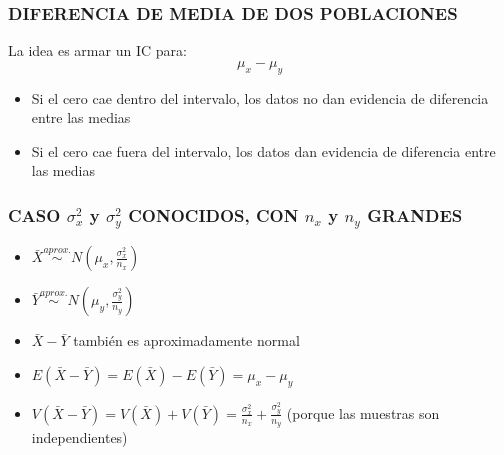 \documentclass{beamer}
\begin{document}
\begin{frame}
\frametitle{DIFERENCIA DE MEDIA DE DOS POBLACIONES}
La idea es armar un IC para: $$\mu_x-\mu_y$$
\begin{itemize}
\item Si el cero cae dentro del intervalo, los datos no dan evidencia
de diferencia entre las medias
\item Si el cero cae fuera del intervalo, los datos  dan evidencia
de diferencia entre las medias

\end{itemize}

\end{frame}



\begin{frame}
\frametitle{CASO $\sigma_x^2$ y $\sigma_y^2$ CONOCIDOS, CON $n_x$ y $n_y$ GRANDES}

\begin{itemize}
\item $\bar{X} \stackrel{aprox.}\sim N(\mu_x,\frac{\sigma_x^2}{n_x})$
\item $\bar{Y} \stackrel{aprox.}\sim N(\mu_y,\frac{\sigma_y^2}{n_y})$
\item $\bar{X}-\bar{Y}$ también es aproximadamente normal
\item $E(\bar{X}-\bar{Y})=E(\bar{X})-E(\bar{Y})=\mu_x-\mu_y$
\item
$V(\bar{X}-\bar{Y})=V(\bar{X})+V(\bar{Y})=\frac{\sigma_x^2}{n_x}+\frac{\sigma_y^2}{n_y}$
(porque las muestras son independientes)
\end{itemize}

\end{frame}
\end{document}
